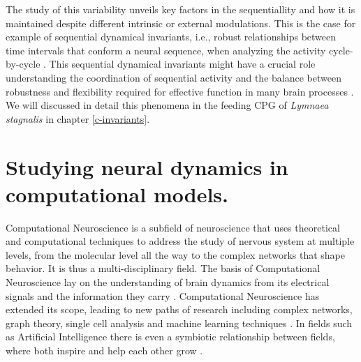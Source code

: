 The study of this variability unveils key factors in the sequentiallity and how it is maintained despite different intrinsic or external modulations. This is the case for example of sequential dynamical invariants, i.e., robust relationships between time intervals that conform a neural sequence, when analyzing the activity cycle-by-cycle \parencite{reyes_artificial_2008,elices_robust_2019,garrido-pena_characterization_2021,berbel_emergence_2024}. This sequential dynamical invariants might have a crucial role understanding the coordination of sequential activity and the balance between robustness and flexibility required for effective function in many brain processes \parencite{tatsuno_analysis_2015,ullen_neural_2003,zimnik_independent_2021,zhou_neural_2020,dragoi_cell_2020}. We will discussed in detail this phenomena in the feeding CPG of \textit{Lymnaea stagnalis} in chapter \ref{c-invariants}.


\section{Studying neural dynamics in computational models.}
\label{sec:computational neuroscience}
Computational Neuroscience is a subfield of neuroscience that uses theoretical and computational techniques to address the study of nervous system at multiple levels, from the molecular level all the way to the complex networks that shape behavior. It is thus a multi-disciplinary field. The basis of Computational Neuroscience lay on the understanding of brain dynamics from its electrical signals and the information they carry \parencite{schwiening_brief_2012,catterall_hodgkin-huxley_2012,dimitrov_information_2011,shannon_mathematical_1948}. Computational Neuroscience has extended its scope, leading to new paths of research including complex networks, graph theory, single cell analysis and machine learning techniques \parencite{cns2023}. In fields such as Artificial Intelligence there is even a symbiotic relationship between fields, where both inspire and help each other grow \parencite{amunts_human_2019,wozniak_deep_2020,goncalves_training_2020}.

